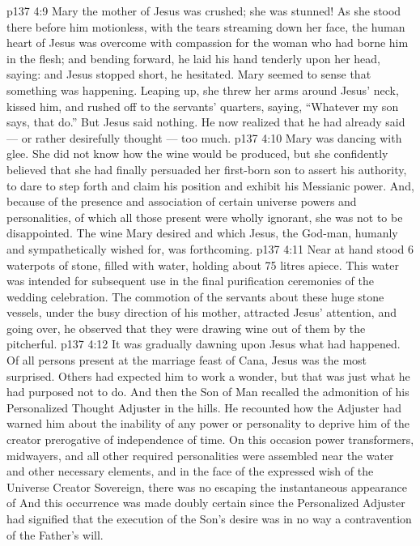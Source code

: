 \vs p137 4:9 Mary the mother of Jesus was crushed; she was stunned! As she stood there before him motionless, with the tears streaming down her face, the human heart of Jesus was overcome with compassion for the woman who had borne him in the flesh; and bending forward, he laid his hand tenderly upon her head, saying:  and Jesus stopped short, he hesitated. Mary seemed to sense that something was happening. Leaping up, she threw her arms around Jesus’ neck, kissed him, and rushed off to the servants’ quarters, saying, “Whatever my son says, that do.” But Jesus said nothing. He now realized that he had already said --- or rather desirefully thought --- too much.
\vs p137 4:10 Mary was dancing with glee. She did not know how the wine would be produced, but she confidently believed that she had finally persuaded her first\hyp{}born son to assert his authority, to dare to step forth and claim his position and exhibit his Messianic power. And, because of the presence and association of certain universe powers and personalities, of which all those present were wholly ignorant, she was not to be disappointed. The wine Mary desired and which Jesus, the God\hyp{}man, humanly and sympathetically wished for, was forthcoming.
\vs p137 4:11 Near at hand stood 6 waterpots of stone, filled with water, holding about 75 litres apiece. This water was intended for subsequent use in the final purification ceremonies of the wedding celebration. The commotion of the servants about these huge stone vessels, under the busy direction of his mother, attracted Jesus’ attention, and going over, he observed that they were drawing wine out of them by the pitcherful.
\vs p137 4:12 It was gradually dawning upon Jesus what had happened. Of all persons present at the marriage feast of Cana, Jesus was the most surprised. Others had expected him to work a wonder, but that was just what he had purposed not to do. And then the Son of Man recalled the admonition of his Personalized Thought Adjuster in the hills. He recounted how the Adjuster had warned him about the inability of any power or personality to deprive him of the creator prerogative of independence of time. On this occasion power transformers, midwayers, and all other required personalities were assembled near the water and other necessary elements, and in the face of the expressed wish of the Universe Creator Sovereign, there was no escaping the instantaneous appearance of  And this occurrence was made doubly certain since the Personalized Adjuster had signified that the execution of the Son’s desire was in no way a contravention of the Father’s will.
